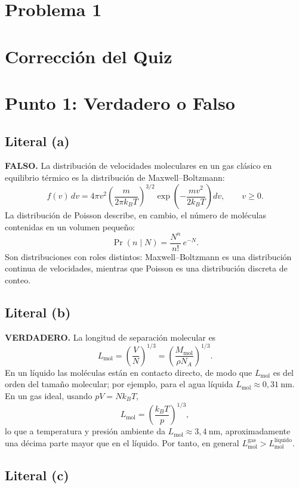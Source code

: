 \documentclass[a4paper]{article}
\begin{document}
\tableofcontents

\section{Problema 1}

\section{Corrección del Quiz}

\section{Punto 1: Verdadero o Falso}

\subsection{Literal (a)}

\textbf{FALSO.} La distribución de velocidades moleculares en un gas clásico en equilibrio térmico es la distribución de Maxwell--Boltzmann:
$$
f(v)\,dv = 4\pi v^{2}\left(\frac{m}{2\pi k_{B}T}\right)^{3/2}\exp\!\left(-\frac{mv^{2}}{2k_{B}T}\right)dv,\qquad v\ge 0.
$$
La distribución de Poisson describe, en cambio, el número de moléculas contenidas en un volumen pequeño:
$$
\Pr(n\mid N)=\frac{N^{n}}{n!}\,e^{-N}.
$$
Son distribuciones con roles distintos: Maxwell--Boltzmann es una distribución continua de velocidades, mientras que Poisson es una distribución discreta de conteo.

\subsection{Literal (b)}

\textbf{VERDADERO.} La longitud de separación molecular es
$$
L_{\mathrm{mol}}=\left(\frac{V}{N}\right)^{1/3}=\left(\frac{M_{\mathrm{mol}}}{\rho N_{A}}\right)^{1/3}.
$$
En un líquido las moléculas están en contacto directo, de modo que $L_{\mathrm{mol}}$ es del orden del tamaño molecular; por ejemplo, para el agua líquida $L_{\mathrm{mol}}\approx 0{,}31\ \mathrm{nm}$. En un gas ideal, usando $pV=Nk_{B}T$,
$$
L_{\mathrm{mol}}=\left(\frac{k_{B}T}{p}\right)^{1/3},
$$
lo que a temperatura y presión ambiente da $L_{\mathrm{mol}}\approx 3{,}4\ \mathrm{nm}$, aproximadamente una décima parte mayor que en el líquido. Por tanto, en general $L_{\mathrm{mol}}^{\mathrm{gas}}>L_{\mathrm{mol}}^{\mathrm{líquido}}$.

\subsection{Literal (c)}
\end{document}
